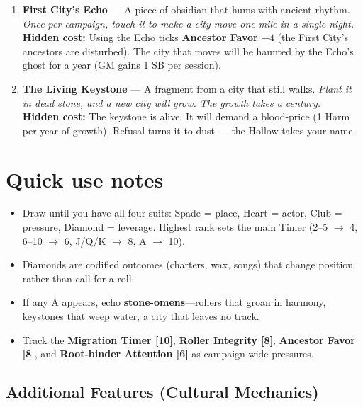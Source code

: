 \begin{enumerate}
\item[K] \textbf{First City's Echo} --- A piece of obsidian that hums with ancient rhythm.
  \hfill \textit{Once per campaign, touch it to make a city move one mile in a single night.} \\
  \textbf{Hidden cost:} Using the Echo ticks \textbf{Ancestor Favor $-4$} (the First City's ancestors are disturbed). The city that moves will be haunted by the Echo's ghost for a year (GM gains 1 SB per session).

\item[A] \textbf{The Living Keystone} --- A fragment from a city that still walks.
  \hfill \textit{Plant it in dead stone, and a new city will grow. The growth takes a century.} \\
  \textbf{Hidden cost:} The keystone is alive. It will demand a blood-price (1 Harm per year of growth). Refusal turns it to dust --- the Hollow takes your name.
\end{enumerate}

\section*{Quick use notes}
\label{sec:ngomebe-quick-use}
\begin{itemize}
\item Draw until you have all four suits: Spade = place, Heart = actor, Club = pressure, Diamond = leverage. Highest rank sets the main Timer (2--5 $\rightarrow$ 4, 6--10 $\rightarrow$ 6, J/Q/K $\rightarrow$ 8, A $\rightarrow$ 10).
\item Diamonds are codified outcomes (charters, wax, songs) that change position rather than call for a roll.
\item If any A appears, echo \textbf{stone-omens}---rollers that groan in harmony, keystones that weep water, a city that leaves no track.
\item Track the \textbf{Migration Timer [10]}, \textbf{Roller Integrity [8]}, \textbf{Ancestor Favor [8]}, and \textbf{Root-binder Attention [6]} as campaign-wide pressures.
\end{itemize}

\subsection*{Additional Features (Cultural Mechanics)}
\label{sec:ngomebe-mechanics}

